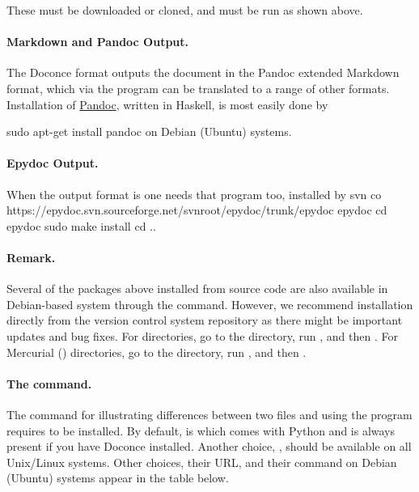 \documentclass[%
oneside,                 %
final,                   %
10pt]{article}
\begin{document}
\noindent
These must be downloaded or cloned, and  must be run as shown
above.

\paragraph{Markdown and Pandoc Output.}
The Doconce format  outputs the document in the Pandoc
extended Markdown format, which via the  program can be
translated to a range of other formats. Installation of \href{{http://johnmacfarlane.net/pandoc/}}{Pandoc}, written in Haskell, is most
easily done by

\bsys
sudo apt-get install pandoc
\esys
on Debian (Ubuntu) systems.

\paragraph{Epydoc Output.}
When the output format is  one needs that program too, installed
by
\bsys
svn co https://epydoc.svn.sourceforge.net/svnroot/epydoc/trunk/epydoc epydoc
cd epydoc
sudo make install
cd ..
\esys

\paragraph{Remark.}
Several of the packages above installed from source code
are also available in Debian-based system through the
 command. However, we recommend installation directly
from the version control system repository as there might be important
updates and bug fixes. For  directories, go to the directory,
run , and then . For
Mercurial () directories, go to the directory, run
, and then .

\paragraph{The \protect{} command.}
The  command for illustrating differences between
two files  and  using the program  requires 
to be installed. By default,  is  which comes with Python
and is always present if you have Doconce installed. Another choice, ,
should be available on all Unix/Linux systems. Other choices, their
URL, and their  command on Debian (Ubuntu) systems
appear in the table below.
\end{document}
